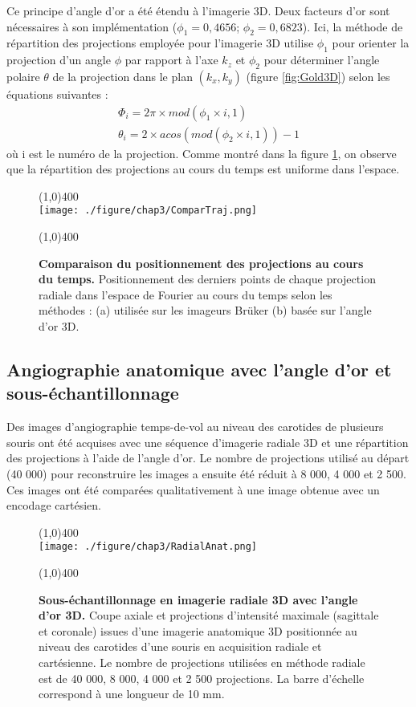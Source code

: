 Ce principe d'angle d'or a été étendu à l'imagerie 3D. Deux facteurs d'or sont nécessaires à son implémentation ($\phi_1=0,4656$; $\phi_2=0,6823$). Ici, la méthode de répartition des projections employée pour l'imagerie 3D utilise $\phi_1$ pour orienter la projection d'un angle $\phi$ par rapport à l'axe $k_z$ et $\phi_2$ pour déterminer l'angle polaire $\theta$ de la projection dans le plan $(k_x,k_y)$ (figure \ref{fig:Gold3D}) selon les équations suivantes :
\begin{equation}
\label{eq:GoldPremier}
\begin{array}{c}
\Phi_i=2\pi \times mod(\phi_1 \times i,1) \\
\theta_i=2 \times acos(mod(\phi_2 \times i,1)) -1
\end{array}
\end{equation}
où i est le numéro de la projection. Comme montré dans la figure \ref{fig:ComparTraj}, on observe que la répartition des projections au cours du temps est uniforme dans l'espace.

\begin{figure}[h]
\centering \line(1,0){400} \\
\texttt{[image: ./figure/chap3/ComparTraj.png]}
\caption[Comparaison du positionnement des projections au cours du temps.]{\label{fig:ComparTraj} \textbf{Comparaison du positionnement des projections au cours du temps.} Positionnement des derniers points de chaque projection radiale dans l'espace de Fourier au cours du temps selon les méthodes : (a) utilisée sur les imageurs Brüker (b) basée sur l'angle d'or 3D.}
\line(1,0){400} \\ \end{figure}

\subsection{Angiographie anatomique avec l'angle d'or et sous-échantillonnage}

Des images d'angiographie temps-de-vol au niveau des carotides de plusieurs souris ont été acquises avec une séquence d'imagerie radiale 3D et une répartition des projections à l'aide de l'angle d'or. Le nombre de projections utilisé au départ (40 000) pour reconstruire les images a ensuite été réduit à 8 000, 4 000 et 2 500. Ces images ont été comparées qualitativement à une image obtenue avec un encodage cartésien.

\begin{figure}[H]
\centering \line(1,0){400} \\
\texttt{[image: ./figure/chap3/RadialAnat.png]}
\caption[Sous-échantillonnage en imagerie radiale 3D avec l'angle d'or 3D.]{\label{fig:RadialAnat} \textbf{Sous-échantillonnage en imagerie radiale 3D avec l'angle d'or 3D.}  Coupe axiale et projections d'intensité maximale (sagittale et coronale) issues d'une imagerie anatomique 3D positionnée au niveau des carotides d'une souris en acquisition radiale et cartésienne. Le nombre de projections utilisées en méthode radiale est de 40 000, 8 000, 4 000 et 2 500 projections. La barre d'échelle correspond à une longueur de 10 mm. }
\line(1,0){400} \\ 
\end{figure}

